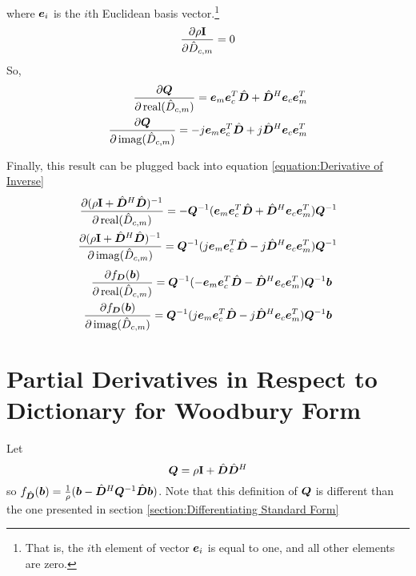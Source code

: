 \begin{appendices}
where $\bm{e}_i$ is the $i$th Euclidean basis vector.\footnote{That is, the $i$th element of vector $\bm{e}_i$ is equal to one, and all other elements are zero.}
\begin{equation}
\frac{\partial \rho{\bf I}}{\partial \hat{D}_{c,m}} = 0
\end{equation}
So,
\begin{equation}
\begin{split}
\frac{\partial \bm{Q}}{\partial 
\operatorname{real}(\hat{D}_{c,m})} = \bm{e}_m\bm{e}_c^T\hat{\bm{D}} + \hat{\bm{D}}^H\bm{e}_c\bm{e}_m^T
\\
\frac{\partial \bm{Q}}{\partial \operatorname{imag}(\hat{D}_{c,m})} = -j\bm{e}_m\bm{e}_c^T\hat{\bm{D}} + j\hat{\bm{D}}^H\bm{e}_c\bm{e}_m^T
\end{split}
\end{equation}

Finally, this result can be plugged back into equation \ref{equation:Derivative of Inverse}
\begin{equation}
\begin{split}
\frac{\partial (\rho{\bf I} + \hat{\bm{D}}^H\hat{\bm{D}})^{-1}}{\partial 
\operatorname{real}(\hat{D}_{c,m})} = -\bm{Q}^{-1}(\bm{e}_m\bm{e}_c^T\hat{\bm{D}} + \hat{\bm{D}}^H\bm{e}_c\bm{e}_m^T )\bm{Q}^{-1}
\\
\frac{\partial (\rho{\bf I} + \hat{\bm{D}}^H\hat{\bm{D}})^{-1}}{\partial \operatorname{imag}(\hat{D}_{c,m})} = \bm{Q}^{-1}(j\bm{e}_m\bm{e}_c^T\hat{\bm{D}} - j\hat{\bm{D}}^H\bm{e}_c\bm{e}_m^T)\bm{Q}^{-1}
\end{split}
\end{equation}
\begin{equation}\label{equation:Partial Dictionary Derivative}
\begin{split}
\frac{\partial f_{\bm{D}}(\bm{b})}{\partial 
\operatorname{real}(\hat{D}_{c,m})} = \bm{Q}^{-1}(-\bm{e}_m\bm{e}_c^T\hat{\bm{D}} - \hat{\bm{D}}^H\bm{e}_c\bm{e}_m^T )\bm{Q}^{-1}\bm{b}
\\
\frac{\partial f_{\bm{D}}(\bm{b})}{\partial \operatorname{imag}(\hat{D}_{c,m})} = \bm{Q}^{-1}(j\bm{e}_m\bm{e}_c^T\hat{\bm{D}} - j\hat{\bm{D}}^H\bm{e}_c\bm{e}_m^T)\bm{Q}^{-1}\bm{b}
\end{split}
\end{equation}


\section{Partial Derivatives in Respect to Dictionary for Woodbury Form} \label{section:Differentiating Woodbury Form}
Let
%
\begin{equation}
\bm{Q} = \rho{\bf I} + \hat{\bm{D}}\hat{\bm{D}}^H
\end{equation}
%
so $f_{\hat{\bm{D}}}(\bm{b}) = \frac{1}{\rho}(\bm{b} - \hat{\bm{D}}^H\bm{Q}^{-1}\hat{\bm{D}}\bm{b})$. Note that this definition of $\bm{Q}$ is different than the one presented in section \ref{section:Differentiating Standard Form}


\end{appendices}
